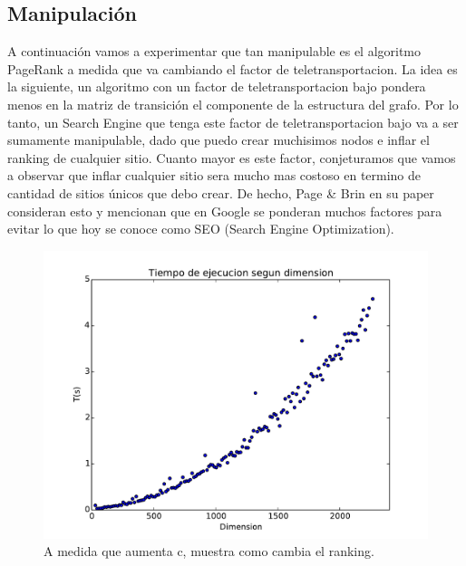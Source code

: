 \pagebreak
\subsection{Manipulación}

A continuación vamos a experimentar que tan manipulable es el algoritmo PageRank a medida que va cambiando el factor de teletransportacion. La idea es la siguiente, un algoritmo con un factor de teletransportacion bajo pondera menos en la matriz de transición el componente de la estructura del grafo. Por lo tanto, un Search Engine que tenga este factor de teletransportacion bajo va a ser sumamente manipulable, dado que puedo crear muchisimos nodos e inflar el ranking de cualquier sitio. Cuanto mayor es este factor, conjeturamos que vamos a observar que inflar cualquier sitio sera mucho mas costoso en termino de cantidad de sitios únicos que debo crear. De hecho, Page \& Brin en su paper consideran esto y mencionan que en Google se ponderan muchos factores para evitar lo que hoy se conoce como SEO (Search Engine Optimization).

\begin{figure}[H]
\centering
\includegraphics[scale=0.7]{images/complejidad.pdf}
\caption{A medida que aumenta c, muestra como cambia el ranking.}
\label{timePageRank}
\end{figure}